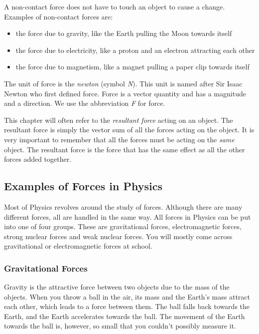 
A non-contact force does not have to touch an object to cause a change. Examples of non-contact forces are:
\begin{itemize}
\item the force due to gravity, like the Earth pulling the Moon towards itself
\item the force due to electricity, like a proton and an electron attracting each other
\item the force due to magnetism, like a magnet pulling a paper clip towards itself
\end{itemize}

The unit of force is the \emph{newton} (symbol \emph{N}). This unit is named after Sir Isaac Newton who first defined force. Force is a vector quantity and has a magnitude and a direction. We use the abbreviation \emph{F} for force.


This chapter will often refer to the \emph{resultant force} acting on an object. The resultant force is simply the vector sum of all the forces acting on the object. It is very important to remember that all the forces must be acting on the \emph{same} object. The resultant force is the force that has the same effect as all the other forces added together.

\subsection{Examples of Forces in Physics}
Most of Physics revolves around the study of forces. Although there are many different forces, all are handled in the same way. All forces in Physics can be put into one of four groups. These are gravitational forces, electromagnetic forces, strong nuclear forces and weak nuclear forces. You will mostly come across gravitational or electromagnetic forces at school.

\subsubsection{Gravitational Forces}
Gravity is the attractive force between two objects due to the mass of the objects. When you throw a ball in the air, its mass and the Earth's mass attract each other, which leads to a force between them. The ball falls back towards the Earth, and the Earth accelerates towards the ball. The movement of the Earth towards the ball is, however, so small that you couldn't possibly measure it.

